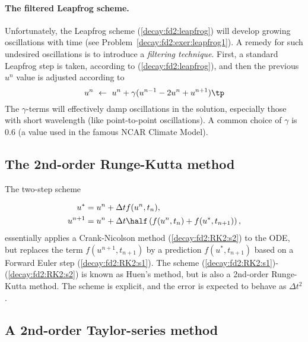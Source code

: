 \documentclass[graybox,sectrefs,envcountresetchap,open=right,final]{svmonodo}
\begin{document}

\paragraph{The filtered Leapfrog scheme.}
Unfortunately, the Leapfrog scheme (\ref{decay:fd2:leapfrog})
will develop growing oscillations with time (see Problem~\ref{decay:fd2:exer:leapfrog1}). A remedy for such undesired oscillations
is to introduce a \emph{filtering technique}. First, a standard Leapfrog
step is taken, according to (\ref{decay:fd2:leapfrog}), and then
the previous $u^n$ value is adjusted according to
\begin{equation}
u^n\ \leftarrow\ u^n + \gamma (u^{n-1} - 2u^n + u^{n+1})
\label{decay:fd2:leapfrog:filtered}
\tp
\end{equation}
The $\gamma$-terms will effectively damp oscillations in the solution,
especially those with short wavelength (like point-to-point oscillations).
A common choice of $\gamma$ is 0.6 (a value used in the
famous NCAR Climate Model).



\subsection{The 2nd-order Runge-Kutta method}


The two-step scheme

\begin{align}
u^* &= u^n + \Delta t f(u^n, t_n),
\label{decay:fd2:RK2:s1}\\ 
u^{n+1} &= u^n + \Delta t \half \left( f(u^n, t_n) + f(u^*, t_{n+1})
\right),
\label{decay:fd2:RK2:s2}
\end{align}
essentially applies a Crank-Nicolson method (\ref{decay:fd2:RK2:s2})
to the ODE, but replaces
the term $f(u^{n+1}, t_{n+1})$ by a prediction
$f(u^{*}, t_{n+1})$ based on a Forward Euler step (\ref{decay:fd2:RK2:s1}).
The scheme (\ref{decay:fd2:RK2:s1})-(\ref{decay:fd2:RK2:s2}) is
known as Huen's method, but is also a 2nd-order Runge-Kutta method.
The scheme is explicit, and the error is expected to behave as $\Delta t^2$.


\subsection{A 2nd-order Taylor-series method}
\end{document}
